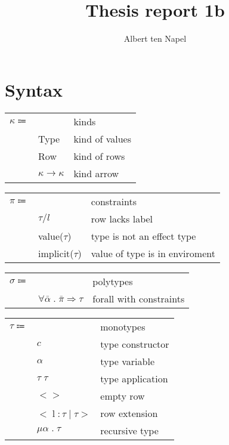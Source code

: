 \documentclass[12pt]{article}
\title{Thesis report 1b}
\author{Albert ten Napel}
\date{}
\begin{document}
\section{Syntax}

\begin{tabular}{l l l}
	$\kappa \Coloneqq$ & & kinds \\
		& Type & kind of values \\
		& Row & kind of rows \\
		& $\kappa \rightarrow \kappa$ & kind arrow \\
\end{tabular}

\vspace{15pt}\noindent
\begin{tabular}{l l l}
	$\pi \Coloneqq$ & & constraints \\
		& $\tau / l$ & row lacks label \\
		& value($\tau$) & type is not an effect type \\
		& implicit($\tau$) & value of type is in enviroment \\
\end{tabular}

\vspace{15pt}\noindent
\begin{tabular}{l l l}
	$\sigma \Coloneqq$ & & polytypes \\
		& $\forall \bar{\alpha} \; . \; \bar{\pi} \Rightarrow \tau$ & forall with constraints \\
\end{tabular}

\vspace{15pt}\noindent
\begin{tabular}{l l l}
	$\tau \Coloneqq$ & & monotypes \\
		& $c$ & type constructor \\
		& $\alpha$ & type variable\\
		& $\tau \; \tau$ & type application \\
		& $<>$ & empty row \\ 
		& $< \; $l$ \; : \tau \; | \; \tau >$ & row extension \\
		& $\mu \alpha \; . \; \tau$ & recursive type \\
\end{tabular}
\end{document}
